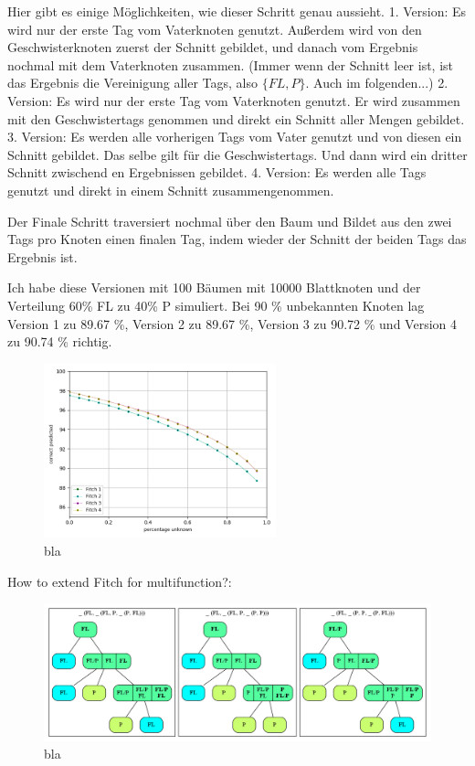         Hier gibt es einige Möglichkeiten, wie dieser Schritt genau aussieht.
        1. Version: Es wird nur der erste Tag vom Vaterknoten genutzt. Außerdem wird von den 
        Geschwisterknoten zuerst der Schnitt gebildet, und danach vom Ergebnis nochmal mit dem Vaterknoten zusammen.
        (Immer wenn der Schnitt leer ist, ist das Ergebnis die Vereinigung aller Tags, also $\{FL,P\}$. Auch im folgenden...)
        2. Version: Es wird nur der erste Tag vom Vaterknoten genutzt. Er wird zusammen mit den 
        Geschwistertags genommen und direkt ein Schnitt aller Mengen gebildet.
        3. Version: Es werden alle vorherigen Tags vom Vater genutzt und von diesen ein Schnitt gebildet.
        Das selbe gilt für die Geschwistertags. Und dann wird ein dritter Schnitt zwischend en Ergebnissen gebildet.
        4. Version: Es werden alle Tags genutzt und direkt in einem Schnitt zusammengenommen.

        Der Finale Schritt traversiert nochmal über den Baum und Bildet aus den zwei Tags pro Knoten einen finalen
        Tag, indem wieder der Schnitt der beiden Tags das Ergebnis ist.

        Ich habe diese Versionen mit 100 Bäumen mit 10000 Blattknoten und der Verteilung 60\% FL zu 40\% P simuliert.
        Bei 90 \% unbekannten Knoten lag Version 1 zu 89.67 \%, Version 2 zu 89.67 \%, Version 3 zu 
          90.72 \% und Version 4 zu 90.74 \% richtig.

        \begin{figure}
          \caption{bla}
          \centering
            \includegraphics[width=0.6\textwidth]{Figures/simulation_fitch_evaluation.png}
        \end{figure}

        How to extend Fitch for multifunction?:
        \begin{figure}
          \caption{bla}
          \centering
            \includegraphics[width=1\textwidth]{Figures/Fitch2.png}
        \end{figure}


